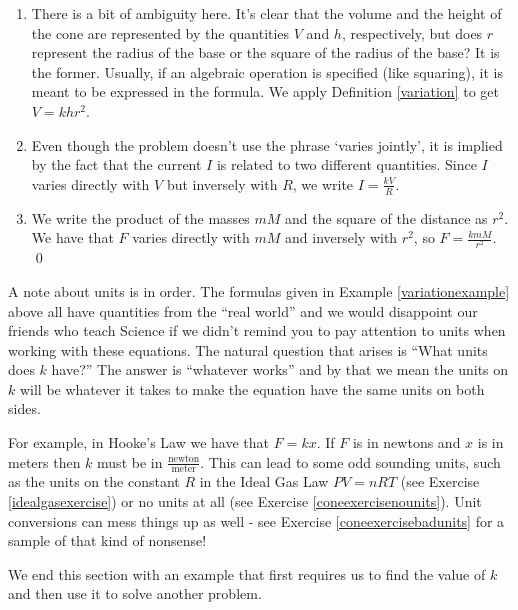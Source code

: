 \documentclass{ximera}
\begin{document}
\begin{example}
\begin{enumerate}
\item  There is a bit of ambiguity here.  It's clear that the volume and the height of the cone are represented by the quantities $V$ and $h$, respectively, but does $r$ represent the radius of the base or the square of the radius of the base?  It is the former.  Usually, if an algebraic operation is specified (like squaring), it is meant to be expressed in the formula.  We apply Definition \ref{variation} to get $V = k h r^{2}$.  

\item  Even though the problem doesn't use the phrase `varies jointly', it is implied by the fact that the current $I$ is related to two different quantities.  Since $I$ varies directly with $V$ but inversely with $R$, we write $I = \frac{k V}{R}$.

\item We write the product of the masses $mM$ and the square of the distance as $r^2$.  We have that $F$ varies directly with $mM$ and inversely with $r^2$, so $F = \frac{kmM}{r^2}$.  \qed

\end{enumerate}

\end{example}

\medskip

A note about units is in order.  The formulas given in Example \ref{variationexample} above all have quantities from the ``real world'' and we would disappoint our friends who teach Science if we didn't remind you to pay attention to units when working with these equations.  The natural question that arises is ``What units does $k$ have?''  The answer is ``whatever works'' and by that we mean the units on $k$ will be whatever it takes to make the equation have the same units on both sides.

\medskip 

For example, in Hooke's Law we have that $F = kx$.  If $F$ is in newtons and $x$ is in meters then $k$ must be in $\frac{\text{newton}}{\text{meter}}$.  This can lead to some odd sounding units, such as the units on the constant $R$ in the Ideal Gas Law $PV = nRT$ (see Exercise \ref{idealgasexercise}) or no units at all (see Exercise \ref{coneexercisenounits}).  Unit conversions can mess things up as well - see Exercise \ref{coneexercisebadunits} for a sample of that kind of nonsense!

\medskip

We end this section with an example that first requires us to find the value of $k$ and then use it to solve another problem.
\end{document}
